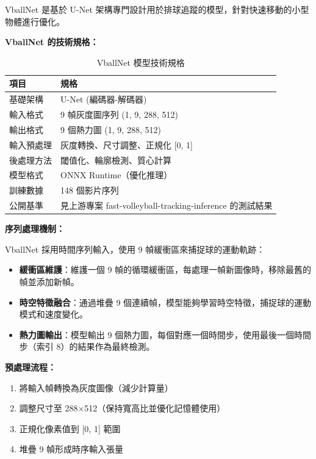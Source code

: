 \documentclass[a4paper,14pt,oneside]{article}
\begin{document}
VballNet 是基於 U-Net 架構專門設計用於排球追蹤的模型，針對快速移動的小型物體進行優化。

\textbf{VballNet 的技術規格：}

\begin{table}[H]
    \centering
    \caption{VballNet 模型技術規格}
    \begin{tabular}{|l|l|}
        \hline
        \textbf{項目} & \textbf{規格} \\
        \hline
        基礎架構 & U-Net (編碼器-解碼器) \\
        \hline
        輸入格式 & 9 幀灰度圖序列 (1, 9, 288, 512) \\
        \hline
        輸出格式 & 9 個熱力圖 (1, 9, 288, 512) \\
        \hline
        輸入預處理 & 灰度轉換、尺寸調整、正規化 [0, 1] \\
        \hline
        後處理方法 & 閾值化、輪廓檢測、質心計算 \\
        \hline
        模型格式 & ONNX Runtime（優化推理） \\
        \hline
        訓練數據 & 148 個影片序列 \\
        \hline
        公開基準 & 見上游專案 fast-volleyball-tracking-inference 的測試結果 \\
        \hline
    \end{tabular}
\end{table}

\textbf{序列處理機制：}

VballNet 採用時間序列輸入，使用 9 幀緩衝區來捕捉球的運動軌跡：

\begin{itemize}
    \item \textbf{緩衝區維護}：維護一個 9 幀的循環緩衝區，每處理一幀新圖像時，移除最舊的幀並添加新幀。
    \item \textbf{時空特徵融合}：通過堆疊 9 個連續幀，模型能夠學習時空特徵，捕捉球的運動模式和速度變化。
    \item \textbf{熱力圖輸出}：模型輸出 9 個熱力圖，每個對應一個時間步，使用最後一個時間步（索引 8）的結果作為最終檢測。
\end{itemize}

\textbf{預處理流程：}

\begin{enumerate}
    \item 將輸入幀轉換為灰度圖像（減少計算量）
    \item 調整尺寸至 288×512（保持寬高比並優化記憶體使用）
    \item 正規化像素值到 [0, 1] 範圍
    \item 堆疊 9 幀形成時序輸入張量
\end{enumerate}
\end{document}
